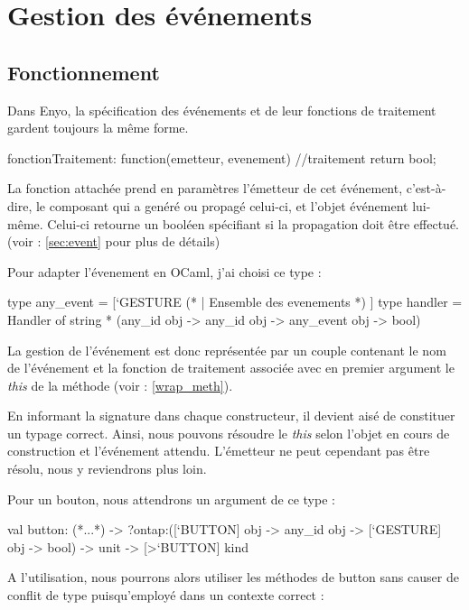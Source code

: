 \section{Gestion des événements}\label{gestevent}
\subsection{Fonctionnement}
Dans Enyo, la spécification des événements et de leur fonctions de traitement gardent toujours la même
forme.

\begin{JavaScript}
  fonctionTraitement: function(emetteur, evenement){
                          //traitement
                          return bool; }
\end{JavaScript}

La fonction attachée prend en paramètres l'émetteur de cet événement, c'est-à-dire, 
le composant qui a genéré ou propagé celui-ci, et l'objet événement lui-même.
Celui-ci retourne un booléen spécifiant si la propagation doit être effectué.
(voir : \ref{sec:event} pour plus de détails)

Pour adapter l'évenement en OCaml, j'ai choisi ce type :
\begin{OCaml}
  type any_event = [`GESTURE (* |  Ensemble des evenements *) ]
  type handler = Handler of string * (any_id obj -> any_id obj -> any_event obj -> bool)
\end{OCaml}

La gestion de l'événement est donc représentée par un couple contenant le nom de l'événement et la 
fonction de traitement associée avec en premier argument le \emph{this} de la méthode (voir : \ref{wrap_meth}).

En informant la signature dans chaque constructeur, il devient aisé de constituer un typage correct.
Ainsi, nous pouvons résoudre le \emph{this} selon l'objet en cours de construction et l'événement attendu.
L'émetteur ne peut cependant pas être résolu, nous y reviendrons plus loin.

Pour un bouton, nous attendrons un argument de ce type :

\begin{OCaml}
  val button:
    (*...*)
    -> ?ontap:([`BUTTON] obj -> any_id obj -> [`GESTURE] obj -> bool)
    -> unit -> [>`BUTTON] kind
\end{OCaml}

A l'utilisation, nous pourrons alors utiliser les méthodes de button sans causer de conflit de type 
puisqu'employé dans un contexte correct :


